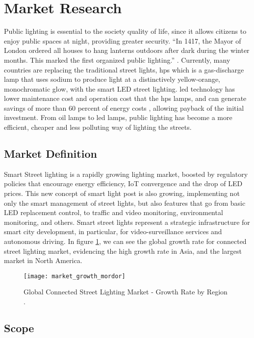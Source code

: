 \section{Market Research}
Public lighting is essential to the society quality of life, since it allows citizens to enjoy public spaces at night, providing greater security. “In 1417, the Mayor of London ordered all houses to hang lanterns outdoors after dark during the winter months. This marked the first organized public lighting.” \cite{street_lighting_history}. Currently, many countries are replacing the traditional street lights, \ac{hps} which is a gas-discharge lamp that uses sodium to produce light at a distinctively yellow-orange, monochromatic glow, with the smart LED street lighting. \ac{led} technology has lower maintenance cost and operation cost that the \ac{hps} lamps, and can generate savings of more than 60 percent of energy costs \cite{light_pollution}, allowing payback of the initial investment. From oil lamps to \ac{led} lamps, public lighting has become a more efficient, cheaper and less polluting way of lighting the streets.

\subsection{Market Definition}
Smart Street lighting is a rapidly growing lighting market, boosted by regulatory policies that encourage energy efficiency, IoT convergence and the drop of LED prices. This new concept of smart light post is also growing, implementing not only the smart management of street lights, but also features that go from basic LED replacement control, to traffic and video monitoring, environmental monitoring, and others. Smart street lights represent a strategic infrastructure for smart city development, in particular, for video-surveillance services and autonomous driving. \cite{market_growth_2} In figure \ref{fig:market_growth}, we can see the global growth rate for connected street lighting market, evidencing the high growth rate in Asia, and the largest market in North America.

\begin{figure}[ht]
	\centering
	\texttt{[image: market\_growth\_mordor]}
	\caption{Global Connected Street Lighting Market - Growth Rate by Region \cite{market_growth}.}
	\label{fig:market_growth}
\end{figure}

\subsection{Scope}

